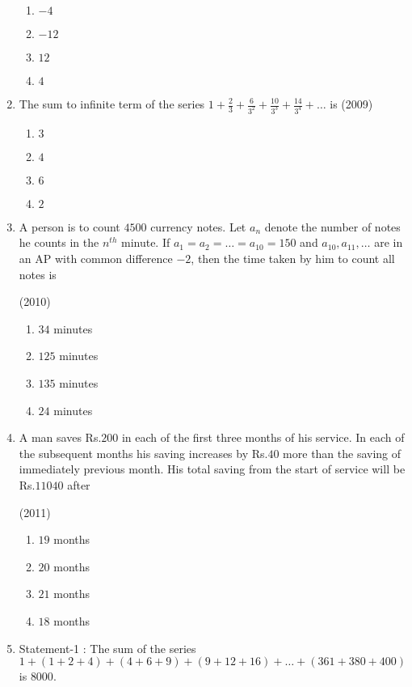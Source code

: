 \documentclass[journal,12pt,twocolumn]{IEEEtran}
\theoremstyle{remark}
\begin{document}
\begin{enumerate}
    \begin{enumerate}
    \item$-4$
    \item$-12$
    \item$12$ 
    \item$4$ 
    \end{enumerate}
    \item The sum to infinite term of the series $1+\frac{2}{3}+\frac{6}{3^2}+\frac{10}{3^3}+\frac{14}{3^4}+\dots$ is
    \hfill(2009)
    \begin{enumerate}
    \item $3$
    \item $4$
    \item $6$
    \item $2$
    \end{enumerate}
    \item  A person is to count $4500$ currency notes. Let $a_n$ denote the number of notes he counts in the $n^{th}$ minute. If $a_1=a_2=\dots=a_{10}=150$ and $a_{10},a_{11},\dots$ are in an AP with common difference $-2$, then the time taken by him to count all notes is   
     
    \hfill(2010)
    
    \begin{enumerate}
    \item$34$ minutes
    \item$125$ minutes
    \item$135$ minutes
    \item$24$ minutes 
    \end{enumerate}
    \item A man saves Rs.$200$ in each of the first three months of his service. In each of the subsequent months his saving increases by Rs.$40$ more than the saving of immediately previous month. His total saving from the start of service will be Rs.$11040$ after    
    
    \hfill(2011)
    
    \begin{enumerate}
    \item$19$ months
    \item$20$ months
    \item$21$ months
    \item$18$ months

    \end{enumerate}
    \item 
    Statement-1 : The sum of the series $1+(1+2+4)+(4+6+9)+(9+12+16)+\dots+(361+380+400)$ is $8000$.    
    

\end{enumerate}
\end{document}
